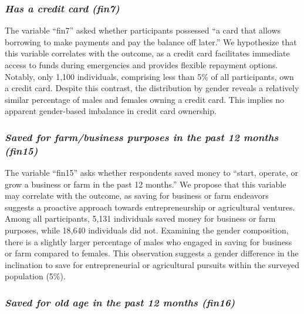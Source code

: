 \documentclass[12pt]{article}
\begin{document}
\hypertarget{has-a-credit-card-fin7}{%
\subsubsection{\texorpdfstring{\emph{Has a credit card
(fin7)}}{Has a credit card (fin7)}}\label{has-a-credit-card-fin7}}

The variable ``fin7'' asked whether participants possessed ``a card that
allows borrowing to make payments and pay the balance off later.'' We
hypothesize that this variable correlates with the outcome, as a credit
card facilitates immediate access to funds during emergencies and
provides flexible repayment options. Notably, only 1,100 individuals,
comprising less than 5\% of all participants, own a credit card. Despite
this contrast, the distribution by gender reveals a relatively similar
percentage of males and females owning a credit card. This implies no
apparent gender-based imbalance in credit card ownership.

\hypertarget{saved-for-farmbusiness-purposes-in-the-past-12-months-fin15}{%
\subsubsection{\texorpdfstring{\emph{Saved for farm/business purposes in
the past 12 months
(fin15)}}{Saved for farm/business purposes in the past 12 months (fin15)}}\label{saved-for-farmbusiness-purposes-in-the-past-12-months-fin15}}

The variable ``fin15'' asks whether respondents saved money to ``start,
operate, or grow a business or farm in the past 12 months.'' We propose
that this variable may correlate with the outcome, as saving for
business or farm endeavors suggests a proactive approach towards
entrepreneurship or agricultural ventures. Among all participants, 5,131
individuals saved money for business or farm purposes, while 18,640
individuals did not. Examining the gender composition, there is a
slightly larger percentage of males who engaged in saving for business
or farm compared to females. This observation suggests a gender
difference in the inclination to save for entrepreneurial or
agricultural pursuits within the surveyed population (5\%).

\hypertarget{saved-for-old-age-in-the-past-12-months-fin16}{%
\subsubsection{\texorpdfstring{\emph{Saved for old age in the past 12
months
(fin16)}}{Saved for old age in the past 12 months (fin16)}}\label{saved-for-old-age-in-the-past-12-months-fin16}}
\end{document}
